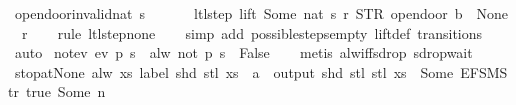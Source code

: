 \begin{isabellebody}
%
\isadelimproof
\isanewline
%
\endisadelimproof
\isanewline
{}\isamarkupfalse%
\ opendoor{\isacharunderscore}invalid{\isacharunderscore}nat{\isacharcolon}\ {\isachardoublequoteopen}s\ {\isasymnotin}\ {\isacharbraceleft}{}{\isacharcomma}\ {}{\isacharcomma}\ {}{\isacharcomma}\ {}{\isacharbraceright}\ {\isasymLongrightarrow}\ ltl{\isacharunderscore}step\ lift\ {\isacharparenleft}Some\ {\isacharparenleft}nat\ s{\isacharparenright}{\isacharparenright}\ r\ {\isacharparenleft}STR\ {\isacharprime}{\isacharprime}opendoor{\isacharprime}{\isacharprime}{\isacharcomma}\ b{\isacharparenright}\ {\isacharequal}\ {\isacharparenleft}None{\isacharcomma}\ {\isacharbrackleft}{\isacharbrackright}{\isacharcomma}\ r{\isacharparenright}{\isachardoublequoteclose}\isanewline
%
\isadelimproof
\ \ %
\endisadelimproof
%
\isatagproof
{}\isamarkupfalse%
\ {\isacharparenleft}rule\ ltl{\isacharunderscore}step{\isacharunderscore}none{\isacharparenright}\isanewline
\ \ \isamarkupfalse%
\ {\isacharparenleft}simp\ add{\isacharcolon}\ possible{\isacharunderscore}steps{\isacharunderscore}empty\ lift{\isacharunderscore}def\ transitions{\isacharparenright}\isanewline
\ \ \isamarkupfalse%
\ auto%
\endisatagproof
{\isafoldproof}%
%
\isadelimproof
\isanewline
%
\endisadelimproof
\isanewline
{}\isamarkupfalse%
\ not{\isacharunderscore}ev{\isacharcolon}\ {\isachardoublequoteopen}ev\ p\ s\ {\isasymLongrightarrow}\ alw\ {\isacharparenleft}not\ p{\isacharparenright}\ s\ {\isasymLongrightarrow}\ False{\isachardoublequoteclose}\isanewline
%
\isadelimproof
\ \ %
\endisadelimproof
%
\isatagproof
{}\isamarkupfalse%
\ {\isacharparenleft}metis\ alw{\isacharunderscore}iff{\isacharunderscore}sdrop\ sdrop{\isacharunderscore}wait{\isacharparenright}%
\endisatagproof
{\isafoldproof}%
%
\isadelimproof
\isanewline
%
\endisadelimproof
\isanewline
{}\isamarkupfalse%
\ stop{\isacharunderscore}at{\isacharunderscore}None{\isacharcolon}\ {\isachardoublequoteopen}alw\ {\isacharparenleft}{\isasymlambda}xs{\isachardot}\ label\ {\isacharparenleft}shd\ {\isacharparenleft}stl\ xs{\isacharparenright}{\isacharparenright}\ {\isacharequal}\ a\ {\isasymlongrightarrow}\ output\ {\isacharparenleft}shd\ {\isacharparenleft}stl\ {\isacharparenleft}stl\ xs{\isacharparenright}{\isacharparenright}{\isacharparenright}\ {\isasymnoteq}\ {\isacharbrackleft}Some\ {\isacharparenleft}EFSM{\isachardot}Str\ {\isacharprime}{\isacharprime}true{\isacharprime}{\isacharprime}{\isacharparenright}{\isacharcomma}\ Some\ n{\isacharbrackright}{\isacharparenright}\isanewline

\end{isabellebody}
